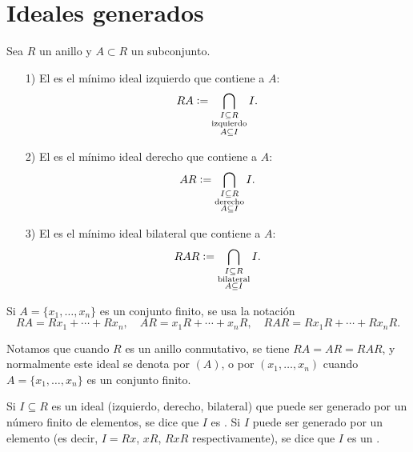 \section{Ideales generados}

\begin{definicion}
  Sea $R$ un anillo y $A \subset R$ un subconjunto.

  \begin{enumerate}
  \item[1)] El 
    es el mínimo ideal izquierdo que contiene a $A$:
    $$RA \mathrel{\mathop:}= \bigcap_{\substack{I\subseteq R \\ \text{izquierdo} \\ A\subseteq I}} I.$$

  \item[2)] El  es el mínimo ideal derecho
    que contiene a $A$:
    $$AR \mathrel{\mathop:}= \bigcap_{\substack{I\subseteq R \\ \text{derecho} \\ A\subseteq I}} I.$$

  \item[3)] El  es el mínimo ideal
    bilateral que contiene a $A$:
    $$RAR \mathrel{\mathop:}= \bigcap_{\substack{I\subseteq R \\ \text{bilateral} \\ A\subseteq I}} I.$$
  \end{enumerate}
\end{definicion}

\begin{comentario}
  Si $A = \{ x_1,\ldots,x_n \}$ es un conjunto finito, se usa la notación
  \[ RA = R x_1 + \cdots + R x_n, \quad
     AR = x_1 R + \cdots + x_n R, \quad
     RAR = R x_1 R + \cdots + R x_n R. \]
\end{comentario}

\begin{comentario}
  Notamos que cuando $R$ es un anillo conmutativo, se tiene $RA = AR = RAR$,
  y normalmente este ideal se denota por $(A)$, o por $(x_1,\ldots,x_n)$ cuando
  $A = \{ x_1, \ldots, x_n \}$ es un conjunto finito.
\end{comentario}

\begin{definicion}
  Si $I \subseteq R$ es un ideal (izquierdo, derecho, bilateral) que puede ser
  generado por un número finito de elementos, se dice que $I$ es
  . Si $I$ puede
  ser generado por un elemento (es decir, $I = Rx$, $xR$, $RxR$
  respectivamente), se dice que $I$ es un
  .
\end{definicion}

